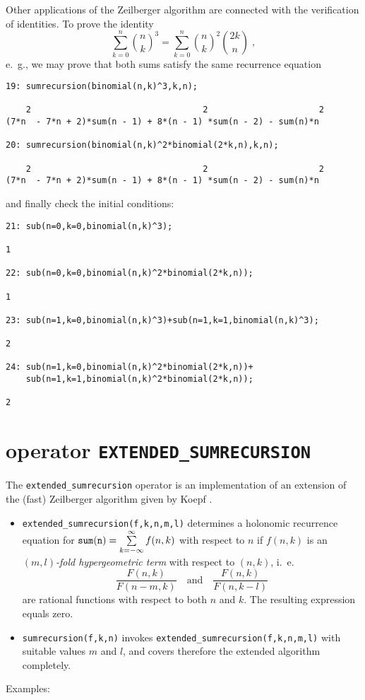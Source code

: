 Other applications of the Zeilberger algorithm are connected with
the verification of identities. To prove the identity
\[
\sum_{k=0}^n
{{n}\choose{k}}^3
=
\sum_{k=0}^n
{{n}\choose{k}}^2 {{2k}\choose{n}}
\;,
\]
e.\ g., we may prove that both sums satisfy the same recurrence equation

{\small
\begin{verbatim}
19: sumrecursion(binomial(n,k)^3,k,n);

    2                                  2                      2
(7*n  - 7*n + 2)*sum(n - 1) + 8*(n - 1) *sum(n - 2) - sum(n)*n

20: sumrecursion(binomial(n,k)^2*binomial(2*k,n),k,n);

    2                                  2                      2
(7*n  - 7*n + 2)*sum(n - 1) + 8*(n - 1) *sum(n - 2) - sum(n)*n
\end{verbatim}
}\noindent
and finally check the initial conditions:

{\small
\begin{verbatim}
21: sub(n=0,k=0,binomial(n,k)^3);

1

22: sub(n=0,k=0,binomial(n,k)^2*binomial(2*k,n));

1

23: sub(n=1,k=0,binomial(n,k)^3)+sub(n=1,k=1,binomial(n,k)^3);

2

24: sub(n=1,k=0,binomial(n,k)^2*binomial(2*k,n))+
    sub(n=1,k=1,binomial(n,k)^2*binomial(2*k,n));

2
\end{verbatim}
}\noindent

\section{\REDUCE{} operator {\tt EXTENDED\_SUMRECURSION}}
\label{sec:EXTENDED_SUMRECURSION}

The {\tt extended\verb+_+sumrecursion} operator is an implementation
of an extension of the (fast) Zeilberger algorithm given by Koepf
\cite{Koepf}.
\begin{itemize}
\item
{\tt extended\verb+_+sumrecursion(f,k,n,m,l)} determines a holonomic recurrence
equation for ${\tt sum(n)} =\sum\limits_{k=-\infty}^\infty f(n,k)$
with respect to $n$ if $f(n,k)$ is an {\sl $(m,l)$-fold hypergeometric term}
with respect to $(n,k)$, i.\ e.\
\[
\frac{F(n,k)}{F(n-m,k)}
\quad
\mbox{and}
\quad
\frac{F(n,k)}{F(n,k-l)}
\]
are rational functions with respect to both $n$ and $k$.
The resulting expression equals zero.
\item
{\tt sumrecursion(f,k,n)} invokes {\tt extended\verb+_+sumrecursion(f,k,n,m,l)}
with suitable values $m$ and $l$, and covers therefore the extended
algorithm completely.
\end{itemize}
Examples:

